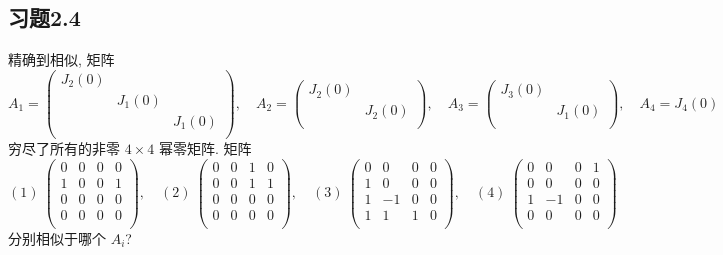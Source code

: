 \documentclass{ctexart}
\begin{document}
\subsection{习题2.4}
\begin{exercise}%
    精确到相似, 矩阵
    \[A_1=\begin{pmatrix}
        J_2(0) \\
        & J_1(0) \\
        && J_1(0) \\
    \end{pmatrix},\quad A_2=\begin{pmatrix}
        J_2(0) \\
        & J_2(0) \\
    \end{pmatrix},\quad A_3=\begin{pmatrix}
        J_3(0) \\
        & J_1(0) \\
    \end{pmatrix},\quad A_4=J_4(0)\]
    穷尽了所有的非零 $4\times 4$ 幂零矩阵. 矩阵
    \[(1)\ \begin{pmatrix}
        0 & 0 & 0 & 0 \\
        1 & 0 & 0 & 1 \\
        0 & 0 & 0 & 0 \\
        0 & 0 & 0 & 0 \\
    \end{pmatrix},\quad(2)\ \begin{pmatrix}
        0 & 0 & 1 & 0 \\
        0 & 0 & 1 & 1 \\
        0 & 0 & 0 & 0 \\
        0 & 0 & 0 & 0 \\
    \end{pmatrix},\quad(3)\ \begin{pmatrix}
        0 & 0 & 0 & 0 \\
        1 & 0 & 0 & 0 \\
        1 & -1 & 0 & 0 \\
        1 & 1 & 1 & 0 \\
    \end{pmatrix},\quad(4)\ \begin{pmatrix}
        0 & 0 & 0 & 1 \\
        0 & 0 & 0 & 0 \\
        1 & -1 & 0 & 0 \\
        0 & 0 & 0 & 0 \\
    \end{pmatrix}\]
    分别相似于哪个 $A_i$?
\end{exercise}
\end{document}
